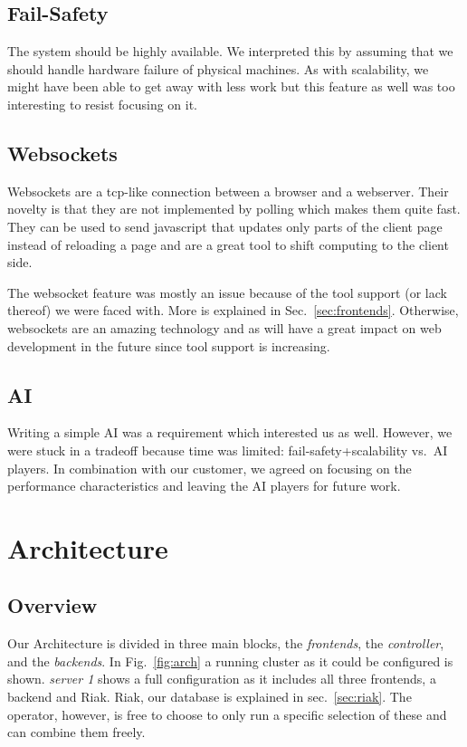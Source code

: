 \documentclass[11pt,a4paper]{report}
\begin{document}
\subsection{Fail-Safety}
The system should be highly available. We interpreted this by assuming that we
should handle hardware failure of physical machines. As with scalability, we
might have been able to get away with less work but this feature as well was
too interesting to resist focusing on it.

\subsection{Websockets}
Websockets\cite{websockets} are a tcp-like connection between a browser and a
webserver.
Their novelty is that they are not implemented by polling which makes them quite
fast.
They can be used to send javascript that updates only parts of the client page
instead of reloading a page and are a great tool to shift computing to the
client side.

The websocket feature was mostly an issue because of the tool support (or lack
thereof) we were faced with. More is explained in Sec.~\ref{sec:frontends}.
Otherwise, websockets are an amazing technology and as will have a great impact
on web development in the future since tool support is increasing.

\subsection{AI}
Writing a simple AI was a requirement which interested us as well. However, we
were stuck in a tradeoff because time was limited: fail-safety+scalability
vs.\ AI players. In combination with our customer, we agreed on focusing on the
performance characteristics and leaving the AI players for future work.

\section{Architecture}
\subsection{Overview}

Our Architecture is divided in three main blocks, the {\em frontends}, the
{\em controller}, and the {\em backends}. In Fig.~\ref{fig:arch} a running
cluster as it could be configured is shown. {\em server 1} shows a full
configuration as it includes all three frontends, a backend and Riak. Riak, our
database is explained in sec.~\ref{sec:riak}.
The operator, however, is free to choose to only run a specific selection of
these and can combine them freely.
\end{document}
